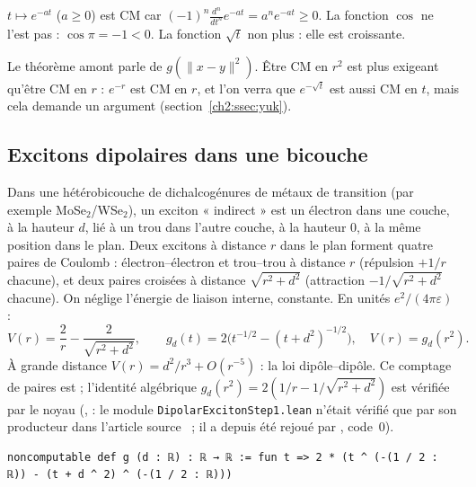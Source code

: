 \begin{example}
$t\mapsto e^{-at}$ ($a\ge0$) est CM car $(-1)^n\frac{d^n}{dt^n}e^{-at}=a^ne^{-at}\ge0$. La fonction $\cos$ ne l'est pas :
$\cos\pi=-1<0$. La fonction $\sqrt t$ non plus : elle est croissante.
\end{example}

\begin{remark}[pourquoi la variable $t=r^2$ ?]
Le théorème amont parle de $g(\|x-y\|^2)$. Être CM en $r^2$ est plus exigeant qu'être CM en $r$ : $e^{-r}$ est CM en $r$,
et l'on verra que $e^{-\sqrt t}$ est aussi CM en $t$, mais cela demande un argument (section~\ref{ch2:ssec:yuk}).
\end{remark}

\subsection{Excitons dipolaires dans une bicouche}\label{ch2:ssec:dip}

\begin{physbox}
Dans une hétérobicouche de dichalcogénures de métaux de transition (par exemple MoSe$_2$/WSe$_2$), un exciton
« indirect » est un électron dans une couche, à la hauteur $d$, lié à un trou dans l'autre couche, à la hauteur $0$,
à la même position dans le plan. Deux excitons à distance $r$ dans le plan forment quatre paires de Coulomb : électron--électron
et trou--trou à distance $r$ (répulsion $+1/r$ chacune), et deux paires croisées à distance $\sqrt{r^2+d^2}$ (attraction
$-1/\sqrt{r^2+d^2}$ chacune). On néglige l'énergie de liaison interne, constante. En unités $e^2/(4\pi\varepsilon)$ :
\[V(r)=\frac2r-\frac2{\sqrt{r^2+d^2}},\qquad g_d(t)=2\bigl(t^{-1/2}-(t+d^2)^{-1/2}\bigr),\quad V(r)=g_d(r^2).\]
À grande distance $V(r)=d^2/r^3+O(r^{-5})$ : la loi dipôle--dipôle. Ce comptage de paires est \tierC{} ; l'identité
algébrique $g_d(r^2)=2(1/r-1/\sqrt{r^2+d^2})$ est vérifiée par le noyau (, \tierA{} : le module \texttt{DipolarExcitonStep1.lean} n'était vérifié que par son producteur dans l'article source~\cite{ch2dip} ; il a depuis été rejoué par , code~0).
\end{physbox}

\begin{leanbox}
\begin{lstlisting}[style=chdeux]
noncomputable def g (d : ℝ) : ℝ → ℝ := fun t => 2 * (t ^ (-(1 / 2 : ℝ)) - (t + d ^ 2) ^ (-(1 / 2 : ℝ)))
\end{lstlisting}
\end{leanbox}


